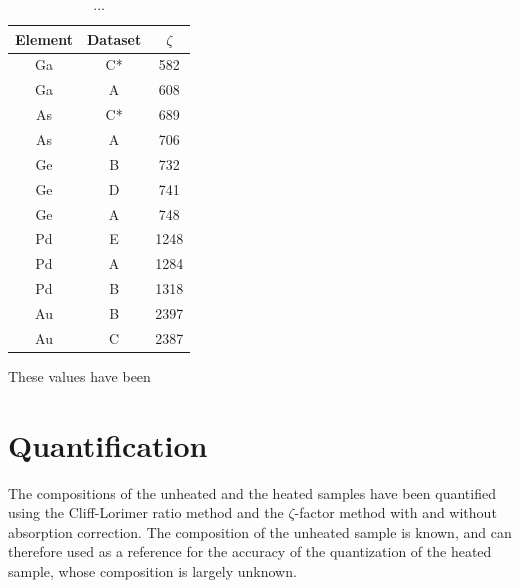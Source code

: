 \begin{table}
	\caption{...}
	\begin{center}
	\begin{tabular}{ccc}

	Element & Dataset & $\zeta$\\ 
	\midrule
	\hline
	Ga & C* & 582\\
	Ga & A  & 608\\
	As & C* & 689\\
	As & A  & 706\\
	Ge & B  & 732\\
	Ge & D  & 741\\
	Ge & A  & 748\\
	Pd & E  & 1248\\
	Pd & A  & 1284\\
	Pd & B  & 1318\\
	Au & B & 2397\\
	Au & C & 2387\\
	\hline
	\end{tabular} 
	\end{center}
	\label{tab:non-heated zeta-values}
\end{table}

These values have been 


\section{Quantification}

The compositions of the unheated and the heated samples have been quantified using the Cliff-Lorimer ratio method and the $\zeta$-factor method with and without absorption correction. The composition of the unheated sample is known, and can therefore used as a reference for the accuracy of the quantization of the heated sample, whose composition is largely unknown.

